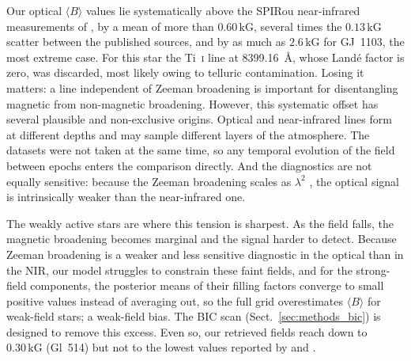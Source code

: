 Our optical $\langle B\rangle$ values lie systematically above the SPIRou near-infrared measurements of \citet{cristofari_2023b}, by a mean of more than $0.60\,\mathrm{kG}$, several times the $0.13\,\mathrm{kG}$ scatter between the published sources, and by as much as $2.6\,\mathrm{kG}$ for GJ~1103, the most extreme case. For this star the Ti~\textsc{i} line at 8399.16~\AA, whose Landé factor is zero, was discarded, most likely owing to telluric contamination. Losing it matters: a line independent of Zeeman broadening is important for disentangling magnetic from non-magnetic broadening. However, this systematic offset has several plausible and non-exclusive origins. Optical and near-infrared lines form at different depths and may sample different layers of the atmosphere. The datasets were not taken at the same time, so any temporal evolution of the field between epochs enters the comparison directly. And the diagnostics are not equally sensitive: because the Zeeman broadening scales as $\lambda^2$ \citep{donati_landstreet+2009, Reiners+2012}, the optical signal is intrinsically weaker than the near-infrared one. 

The weakly active stars are where this tension is sharpest. As the field falls, the magnetic broadening becomes marginal and the signal harder to detect. Because Zeeman broadening is a weaker and less sensitive diagnostic in the optical than in the NIR, our model struggles to constrain these faint fields, and for the strong-field components, the posterior means of their filling factors converge to small positive values instead of averaging out, so the full grid overestimates $\langle B\rangle$ for weak-field stars; a weak-field bias. The BIC scan (Sect.~\ref{sec:methods_bic}) is designed to remove this excess. Even so, our retrieved fields reach down to $0.30\,\mathrm{kG}$ (Gl~514) but not to the lowest values reported by \citet{cristofari_2023b} and \citet{reiners+2022}.


